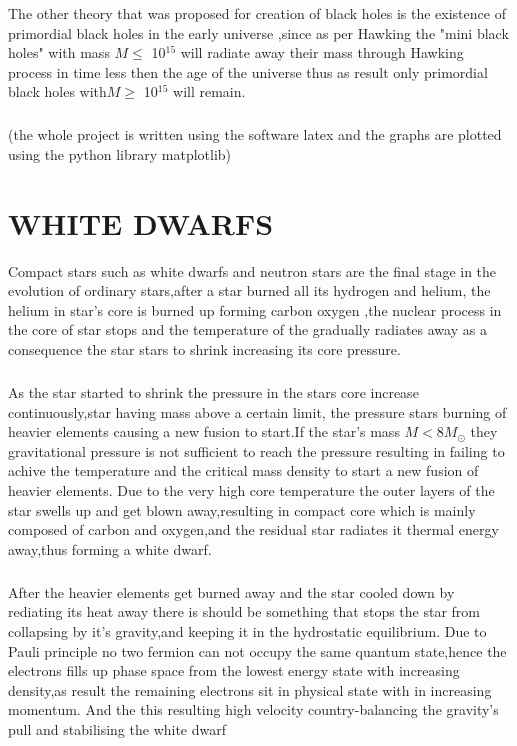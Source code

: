 \documentclass{report}
\begin{document}
\newline
	The other theory that was proposed for creation of black holes is the existence of primordial black holes in the early universe ,since as per Hawking the "mini black holes" with mass $M \le$ 10$^{15}$ will radiate away their mass through Hawking process in time less then the age of the universe thus as result only primordial black holes with$ M\geq$  10$^{15}$ will remain.
\paragraph{ }
(the whole project is written using the software latex and the graphs are plotted using the python library matplotlib)

\chapter{WHITE DWARFS}
Compact stars such as white dwarfs and neutron stars are the final stage in the evolution of ordinary stars,after a star burned all its hydrogen and helium, the helium in star's core is burned up forming carbon oxygen ,the  nuclear process in the core of star stops and the temperature of the gradually radiates away as a consequence the star stars to shrink increasing its core pressure.
\paragraph{}
As the star started to shrink the pressure in the stars core increase continuously,star having mass above a certain limit, the pressure stars burning of heavier elements causing a new fusion to start.If the star's mass $M<8M_\odot$ they gravitational pressure is not sufficient to reach the pressure resulting in failing to achive the temperature and the critical mass density to start a new fusion of heavier elements.
Due to the very high core temperature the outer layers of the star swells up and get blown away,resulting in compact core which is mainly composed of carbon and oxygen,and the residual star radiates  it thermal energy away,thus forming a white dwarf.
\paragraph{ }
After the heavier elements get burned away and the star cooled down by rediating its heat away there is should be something that stops the star from collapsing by it's gravity,and keeping it in the hydrostatic equilibrium. Due to Pauli principle no two fermion can not occupy the same quantum state,hence the electrons fills up phase space from the lowest energy state with increasing density,as result the remaining electrons sit in physical state with in increasing momentum. And the this resulting high velocity country-balancing the gravity's pull and stabilising the white dwarf
\end{document}
